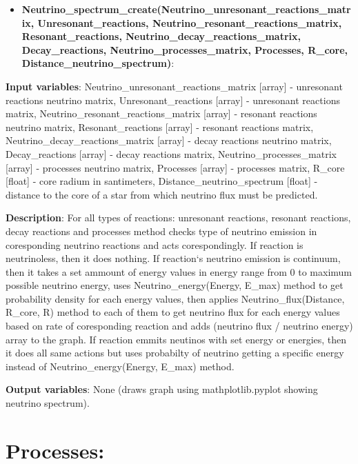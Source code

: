 \documentclass[a4paper,12pt]{article}
\newcommand{\namefunction}[4]{
  \begin{itemize}
    \item \textbf{#1}:
  \end{itemize}
  
  \textbf{Input variables}: #2.
  
  \textbf{Description}: #3.
  
  \textbf{Output variables}: #4.
}
\begin{document}
\namefunction{Neutrino\_spectrum\_create(Neutrino\_unresonant\_reactions\_matrix, Unresonant\_reactions, Neutrino\_resonant\_reactions\_matrix, Resonant\_reactions, Neutrino\_decay\_reactions\_matrix, Decay\_reactions, Neutrino\_processes\_matrix, Processes, R\_core, Distance\_neutrino\_spectrum)}{Neutrino\_unresonant\_reactions\_matrix [array] - unresonant reactions neutrino matrix, Unresonant\_reactions [array] - unresonant reactions matrix, Neutrino\_resonant\_reactions\_matrix [array] - resonant reactions neutrino matrix, Resonant\_reactions [array] - resonant reactions matrix, Neutrino\_decay\_reactions\_matrix [array] - decay reactions neutrino matrix, Decay\_reactions [array] - decay reactions matrix, Neutrino\_processes\_matrix [array] - processes neutrino matrix, Processes [array] - processes matrix, R\_core [float] - core radium in santimeters, Distance\_neutrino\_spectrum [float] - distance to the core of a star from which neutrino flux must be predicted}{For all types of reactions: unresonant reactions, resonant reactions, decay reactions and processes method checks type of neutrino emission in coresponding neutrino reactions and acts corespondingly. If reaction is neutrinoless, then it does nothing. If reaction`s neutrino emission is continuum, then it takes a set ammount of energy values in energy range from 0 to maximum possible neutrino energy, uses Neutrino\_energy(Energy, E\_max) method to get probability density for each energy values, then applies Neutrino\_flux(Distance, R\_core, R) method to each of them to get neutrino flux for each energy values based on rate of coresponding reaction and adds (neutrino flux / neutrino energy) array to the graph. If reaction emmits neutinos with set energy or energies, then it does all same actions but uses probabilty of neutrino getting a specific energy instead of Neutrino\_energy(Energy, E\_max) method}{None (draws graph using mathplotlib.pyplot showing neutrino spectrum)}

\section{Processes:}

\vspace{1em}
\end{document}
